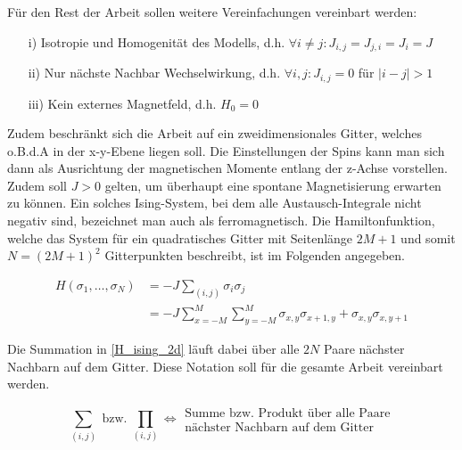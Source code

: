 \noindent Für den Rest der Arbeit sollen weitere Vereinfachungen vereinbart werden:
\begin{itemize}
\item[i)] Isotropie und Homogenität des Modells, d.h. $ \forall i\neq j : J_{i,j} = J_{j,i} = J_i = J $
\item[ii)] Nur nächste Nachbar Wechselwirkung, d.h. $\forall i,j : J_{i,j} = 0$ für $\vert i-j \vert > 1$
\item[iii)] Kein externes Magnetfeld, d.h. $H_0 = 0$
\end{itemize}

\noindent Zudem beschränkt sich die Arbeit auf ein zweidimensionales Gitter, welches o.B.d.A in der x-y-Ebene liegen soll. Die Einstellungen der Spins kann man sich dann als Ausrichtung der magnetischen Momente entlang der z-Achse vorstellen. Zudem soll $J > 0$ gelten, um überhaupt eine spontane Magnetisierung erwarten zu können. Ein solches Ising-System, bei dem alle Austausch-Integrale nicht negativ sind, bezeichnet man auch als ferromagnetisch. Die Hamiltonfunktion, welche das System für ein quadratisches Gitter mit Seitenlänge $2M+1$ und somit $N = (2M+1)^2$ Gitterpunkten beschreibt, ist im Folgenden angegeben.

\begin{grayframe}[frametitle = {2d Ising-Modell ohne externes Magnetfeld}]
\begin{align} 
H(\sigma_1, \dots, \sigma_N) &= - J  \sum_{(i,j)} \sigma_i \sigma_j \label{H_ising_2d}\\
  &= - J \sum_{x = -M}^M \sum_{y = -M}^M \sigma_{x, y} \sigma_{x+1, y} + \sigma_{x, y} \sigma_{x,y+1} \label{H_ising_2d_exp} 
\end{align}
\end{grayframe}

\noindent Die Summation in \eqref{H_ising_2d} läuft dabei über alle $2N$ Paare nächster Nachbarn auf dem Gitter. Diese Notation soll für die gesamte Arbeit vereinbart werden.

\begin{equation}
\sum_{(i,j)} \;\text{bzw.}\; \prod_{(i,j)} \iff  \begin{array}{ll} \text{Summe bzw. Produkt über alle Paare} \\ \text{nächster Nachbarn auf dem Gitter} \end{array}
\end{equation}

